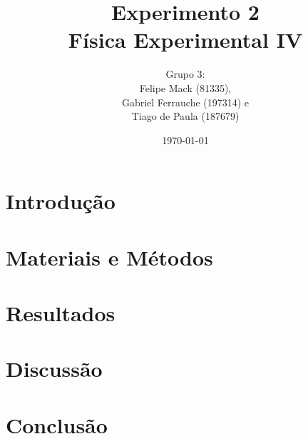 \documentclass[a4paper,portuguese,utf8,T1]{article}
\title{
	\Huge Experimento 2 			\\
    \Large Física Experimental IV
}
\author{
	\small Grupo 3:					\\
	Felipe Mack (81335),			\\
    Gabriel Ferrauche (197314) e	\\
    Tiago de Paula (187679)
}
\date{\small\today}
\begin{document}
	\maketitle

	\begin{abstract}
    	
	\end{abstract}

	\section{Introdução} \label{introducao}
		

	\section{Materiais e Métodos} \label{metodos}
    	

	\section{Resultados} \label{resultados}
	 	

	\section{Discussão} \label{discussao}
    	

    \section{Conclusão} \label{conclusao}
    	

    \printbibliography
\end{document}
